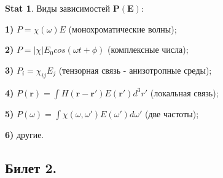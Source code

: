 \documentclass[a4paper,12pt]{article}
\theoremstyle{definition} %
\newtheorem{Stat}{Stat}[section]
\theoremstyle{definition} %
\theoremstyle{remark} %
\begin{document}
\begin{Stat}\label{stat \theStat}
	Виды зависимостей $\mathbf{P}(\mathbf{E})$: \\
     \par \textbf{1)} $P=\chi (\omega) E$ (монохроматические волны); \\
     \par \textbf{2)} $P=|\chi|E_{0}cos(\omega t + \phi)$ (комплексные числа); \\
     \par \textbf{3)} $P_{i}=\chi_{ij}E_{j}$ (тензорная связь - анизотропные среды); \\
	 \par \textbf{4)} $P(\mathbf{r}) = \int H(\mathbf{r}-\mathbf{r}') E(\mathbf{r}') d^{3}r'$ (локальная связь); \\
	 \par \textbf{5)} $P(\omega) = \int \chi (\omega, \omega') E(\omega') d\omega'$ (две частоты); \\
	 \par \textbf{6)} другие.
\end{Stat}

\subsection{Билет 2.}
\end{document}
